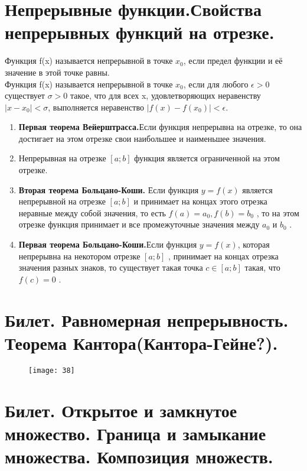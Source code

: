 \documentclass[12pt]{article}
\begin{document}
	\section{Непрерывные функции.Свойства непрерывных функций на отрезке.}
	
	Функция f(x) называется непрерывной в точке $x_0$, если предел функции и её значение в этой точке равны.\\
	Функция f(x) называется непрерывной в точке $x_0$, если для любого $\epsilon >0$ существует $\sigma >0$ такое, что для всех x, удовлетворяющих неравенству $|x-x_0|<\sigma$, выполняется неравенство $|f(x)-f(x_0)|<\epsilon$.
	
	\begin{enumerate}
		\item \textbf{Первая теорема Вейерштрасса.}Если функция непрерывна на отрезке, то она достигает на этом отрезке свои наибольшее и наименьшее значения.
		\item Непрерывная на отрезке $[a;b]$ функция является ограниченной на этом отрезке.
		\item \textbf{Вторая теорема Больцано-Коши.}  Если функция $y=f(x)$  является непрерывной на отрезке $[a;b]$  и принимает на концах этого отрезка неравные между собой значения, то есть $f(a)=a_0 ,f(b)=b_0$  , то на этом отрезке функция принимает и все промежуточные значения между $a_0$  и $b_0$  .
		\item \textbf{Первая теорема Больцано-Коши.}Если функция $y=f(x)$, которая непрерывна на некотором отрезке $[a;b]$ , принимает на концах отрезка значения разных знаков, то существует такая точка $c \in [a;b]$  такая, что $f(c)=0$  .
	\end{enumerate}
	
	
	\section{Билет. Равномерная непрерывность. Теорема Кантора(Кантора-Гейне?).}
	
\begin{figure}
\centering
\texttt{[image: 38]}
\end{figure}

\newpage

	\section{Билет. Открытое и замкнутое множество. Граница и замыкание множества. Композиция множеств.}	
	
\end{document}
